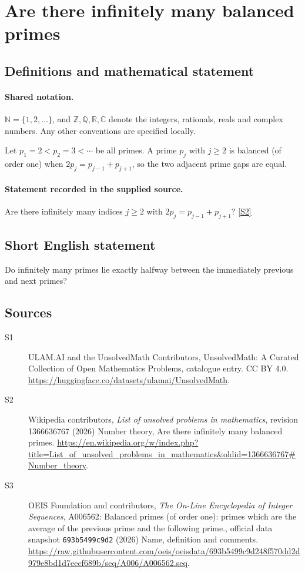 \documentclass[11pt]{article}
\newcommand{\sref}[2]{\hyperlink{source:#1:#2}{[S#2]}}
\begin{document}
\section{Are there infinitely many balanced primes}\label{statement}

\subsection{Definitions and mathematical statement}

\paragraph{Shared notation.}$\mathbb N=\{1,2,\ldots\}$, and $\mathbb Z,\mathbb Q,\mathbb R,\mathbb C$ denote the integers, rationals, reals and complex numbers. Any other conventions are specified locally.


Let $p_1=2<p_2=3<\cdots$ be all primes. A prime $p_j$ with $j\ge2$ is balanced (of order one) when $2p_j=p_{j-1}+p_{j+1}$, so the two adjacent prime gaps are equal.
\paragraph{Statement recorded in the supplied source.}
Are there infinitely many indices $j\ge2$ with $2p_j=p_{j-1}+p_{j+1}$? \sref{statement}{2}
\subsection{Short English statement}
Do infinitely many primes lie exactly halfway between the immediately previous and next primes?
\subsection{Sources}
\begin{description}
\item[\hypertarget{source:statement:1}{S1}] ULAM.AI and the UnsolvedMath Contributors, UnsolvedMath: A Curated Collection of Open Mathematics Problems, catalogue entry. CC BY 4.0. \url{https://huggingface.co/datasets/ulamai/UnsolvedMath}.
\item[\hypertarget{source:statement:2}{S2}] Wikipedia contributors, \emph{List of unsolved problems in mathematics}, revision 1366636767 (2026) Number theory, Are there infinitely many balanced primes. \url{https://en.wikipedia.org/w/index.php?title=List_of_unsolved_problems_in_mathematics&oldid=1366636767#Number_theory}.
\item[\hypertarget{source:statement:3}{S3}] OEIS Foundation and contributors, \emph{The On-Line Encyclopedia of Integer Sequences}, A006562: Balanced primes (of order one): primes which are the average of the previous prime and the following prime., official data snapshot \texttt{693b5499c9d2} (2026) Name, definition and comments. \url{https://raw.githubusercontent.com/oeis/oeisdata/693b5499c9d248f570dd2d979e8bd1d7eecf689b/seq/A006/A006562.seq}.
\end{description}
\label{end:statement}
\end{document}
